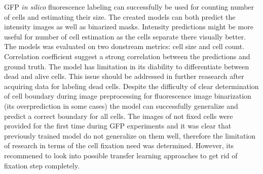 GFP \textit{in silico} fluorescence labeling can successfully be used for counting number of cells and estimating their size. The created models can both predict the intensity images as well as binarized masks. Intensity predictions might be more useful for number of cell estimation as the cells separate there visually better. The models was evaluated on two donstream metrics: cell size and cell count. Correlation coefficient suggest a strong correlation between the predictions and ground truth. The model has limitation in its diability to differentiate between dead and alive cells. This issue should be addressed in further reasearch after acquiring data for labeling dead cells. Despite the difficulty of clear determination of cell boundary during image preprocessing for fluorescence image binarization (its overprediction in some cases) the model can successfully generalize and predict a correct boundary for all cells. The images of not fixed cells were provided for the first time during GFP experiments and it was clear that previously trained model do not generalize on them well, therefore the limitation of research in terms of the cell fixation need was determined. However, its recommened to look into possible transfer learning approaches to get rid of fixation step completely.
  